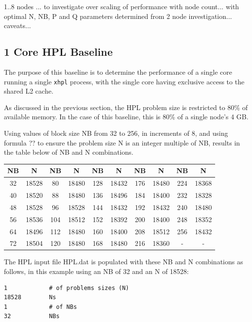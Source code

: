 \documentclass{report}
\begin{document}
1..8 nodes ... to investigate over scaling of performance with node count... with optimal N, NB, P and Q parameters determined from 2 node investigation... caveats...


%
%
\subsection{1 Core HPL Baseline}

The purpose of this baseline is to determine the performance of a single core running a single \verb|xhpl| process, with the single core having exclusive access to the shared L2 cache. 

As discussed in the previous section, the HPL problem size is restricted to 80\% of available memory. In the case of this baseline, this is 80\% of a single node's 4 GB.

Using values of block size NB from 32 to 256, in increments of 8, and using formula ?? to ensure the problem size N is an integer multiple of NB, results in the table below of NB and N combinations.

\begin{center}
	\begin{tabular}{ |c|c|c|c|c|c|c|c|c|c| } 
		\hline
		NB & N & NB & N & NB & N & NB & N & NB & N \\ 
		\hline
		32 & 18528 &  80 & 18480 & 128 & 18432 & 176 & 18480 & 224 & 18368 \\ 
		40 & 18520 &  88 & 18480 & 136 & 18496 & 184 & 18400 & 232 & 18328 \\ 
 		48 & 18528 &  96 & 18528 & 144 & 18432 & 192 & 18432 & 240 & 18480 \\
		56 & 18536 & 104 & 18512 & 152 & 18392 & 200 & 18400 & 248 & 18352 \\ 
 		64 & 18496 & 112 & 18480 & 160 & 18400 & 208 & 18512 & 256 & 18432 \\
		72 & 18504 & 120 & 18480 & 168 & 18480 & 216 & 18360 &   - &     - \\ 
 		\hline
	\end{tabular}
\end{center}

The HPL input file HPL.dat is populated with these NB and N combinations as follows, in this example using an NB of 32 and an N of 18528: 

\lstset{style=listing}
\begin{lstlisting}[numbers=none]
1            # of problems sizes (N)
18528        Ns
1            # of NBs
32           NBs
\end{lstlisting}
\end{document}
